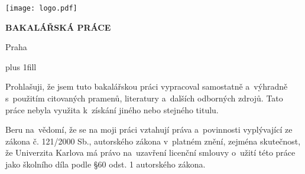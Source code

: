 

\pagestyle{empty}
\hypersetup{pageanchor=false}

\begin{center}

\centerline{\mbox{\texttt{[image: logo.pdf]}}}

\vspace{-8mm}
\vfill

{\bf\Large BAKALÁŘSKÁ PRÁCE}

\vfill

{\LARGE\AutorPrace}

\vspace{15mm}

{
	\begin{spacing}{1.0}
		\LARGE\bfseries\NazevPrace
	\end{spacing}
}

\vfill

\Katedra

\vfill

{
\centerline{\vbox{}}}

\vfill

Praha \RokOdevzdani
\end{center}
\newpage



\hypersetup{pageanchor=true}
\pagestyle{plain}
\vglue 0pt plus 1fill

\noindent
Prohlašuji, že jsem tuto bakalářskou práci vypracoval samostatně a~výhradně
s~použitím citovaných pramenů, literatury a~dalších odborných zdrojů.
Tato práce nebyla využita k~získání jiného nebo stejného titulu.

\medskip\noindent
Beru na~vědomí, že se na moji práci vztahují práva a~povinnosti vyplývající
ze zákona č. 121/2000 Sb., autorského zákona v~platném znění, zejména skutečnost,
že Univerzita Karlova má právo na~uzavření licenční smlouvy o~užití této
práce jako školního díla podle §60 odst. 1 autorského zákona.


